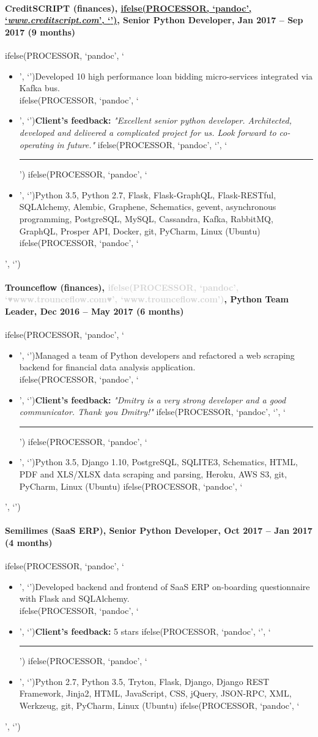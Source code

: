 \documentclass[a4paper,8pt]{extarticle}
\newcommand{\chref}[2]{\href{#1}
{ifelse(PROCESSOR, `pandoc', `#2', `\underline{\smash{#2}}')}}
\newcommand{\itchref}[2]{\chref{#1}{\textit{#2}}}  %
\newcommand{\chrule}{ifelse(PROCESSOR, `pandoc', `', `\vspace{3pt}\hrule')}
\newcommand{\brokenhreflg}[1]{\textcolor{lightgray}{ifelse(PROCESSOR, `pandoc', `♥#1♥', `#1')}}
\newcommand{\pdbeginitemize}{ifelse(PROCESSOR, `pandoc', `\begin{itemize}', `')}
\newcommand{\pditem}{ifelse(PROCESSOR, `pandoc', `\item', `')}
\newcommand{\pdenditemize}{ifelse(PROCESSOR, `pandoc', `\end{itemize}', `')}
\begin{document}
\paragraph*{CreditSCRIPT (finances), \itchref{https://www.creditscript.com}{www.creditscript.com}, Senior Python Developer, Jan 2017 -- Sep 2017 (9 months)}
\pdbeginitemize
\pditem Developed 10 high performance loan bidding micro-services integrated via Kafka bus.\\
\pditem \textbf{Client's feedback:} \textit{"Excellent senior python developer. Architected, developed and delivered a complicated project for us. Look forward to co-operating in future."}
\chrule
\pditem Python 3.5, Python 2.7, Flask, Flask-GraphQL, Flask-RESTful, SQLAlchemy, Alembic, Graphene, Schematics, gevent, asynchronous programming, PostgreSQL, MySQL, Cassandra, Kafka, RabbitMQ, GraphQL, Prosper API, Docker, git, PyCharm, Linux (Ubuntu)
\pdenditemize

\paragraph*{Trounceflow (finances), \brokenhreflg{www.trounceflow.com}, Python Team Leader, Dec 2016 -- May 2017 (6 months)}
\pdbeginitemize
\pditem Managed a team of Python developers and refactored a web scraping backend for financial data analysis application.\\
\pditem \textbf{Client's feedback:} \textit{"Dmitry is a very strong developer and a good communicator. Thank you Dmitry!"}
\chrule
\pditem Python 3.5, Django 1.10, PostgreSQL, SQLITE3, Schematics, HTML, PDF and XLS/XLSX data scraping and parsing, Heroku, AWS S3, git, PyCharm, Linux (Ubuntu)
\pdenditemize

\paragraph*{Semilimes (SaaS ERP), Senior Python Developer, Oct 2017 -- Jan 2017 (4 months)}
\pdbeginitemize
\pditem Developed backend and frontend of SaaS ERP on-boarding questionnaire with Flask and SQLAlchemy.\\
\pditem \textbf{Client's feedback:} 5 stars
\chrule
\pditem Python 2.7, Python 3.5, Tryton, Flask, Django, Django REST Framework, Jinja2, HTML, JavaScript, CSS, jQuery, JSON-RPC, XML, Werkzeug, git, PyCharm, Linux (Ubuntu)
\pdenditemize
\end{document}
